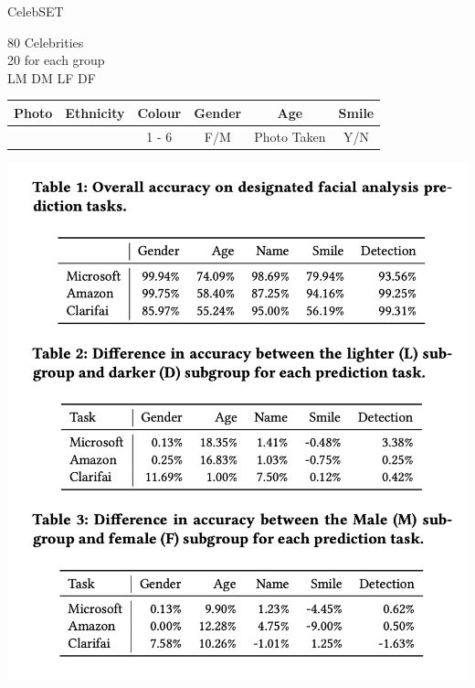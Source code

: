 \documentclass{beamer}
\begin{document}
\begin{frame}
    \begin{center}
    \LARGE{CelebSET}
    \end{center}
\end{frame}

\begin{frame}
    \begin{center}
    \LARGE{80 Celebrities} \\
    \LARGE{20 for each group} \\
    \LARGE{LM} \hspace{.5cm} \LARGE{DM} \hspace{.5cm} \LARGE{LF} \hspace{.5cm} \LARGE{DF} \\
    \end{center}
\end{frame}

\begin{frame}
    \begin{center}
        \begin{tabular}{ c | c | c | c | c |c}
         Photo & Ethnicity & Colour & Gender & Age & Smile \\ \midrule
               &           & 1 - 6  & F/M    &  Photo Taken & Y/N
        \end{tabular}
        \end{center}
\end{frame}

\begin{frame}
    \centering
    \includegraphics[width=.60\textwidth]{static/results.png}
\end{frame}
\end{document}

